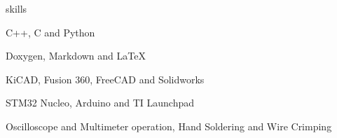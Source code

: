 \begin{section}{skills}
  
\begin{skills}

  \item {} {C++, C and Python}
  \item {} {Doxygen, Markdown and \LaTeX}
  \item {} {KiCAD, Fusion 360, FreeCAD and Solidworks}
  \item {} {STM32 Nucleo, Arduino and TI Launchpad}
  \item {} {Oscilloscope and Multimeter operation, Hand Soldering and Wire Crimping}

\end{skills}

\end{section}